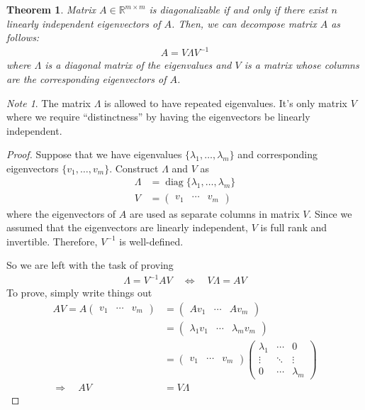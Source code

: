 \documentclass[12pt]{article}
\numberwithin{equation}{section} %
\theoremstyle{plain}
\newtheorem{thm}{Theorem}[section]
\theoremstyle{definition}
\theoremstyle{remark}
\newtheorem*{note}{Note}
\newcommand{\diag}{\operatorname{diag}}
\newcommand{\Rmm}{\mathbb{R}^{m\times m}}
\begin{document}
\begin{thm}
\label{thm:eigendecomp}
Matrix $A\in \Rmm$ is diagonalizable if and only if there exist $n$
linearly independent eigenvectors of $A$. Then, we can decompose matrix
$A$ as follows:
\begin{align*}
  A =
  V \Lambda V^{-1}
\end{align*}
where $\Lambda$ is a diagonal matrix of the eigenvalues and $V$ is a matrix
whose columns are the corresponding eigenvectors of $A$.
\end{thm}
\begin{note}
The matrix $\Lambda$ is allowed to have repeated eigenvalues. It's only matrix
$V$ where we require ``distinctness'' by having the eigenvectors be
linearly independent.
\end{note}

\begin{proof}
Suppose that we have eigenvalues $\{\lambda_1,\ldots,\lambda_m\}$ and
corresponding eigenvectors $\{v_1,\ldots,v_m\}$.
Construct $\Lambda$ and $V$ as
\begin{align*}
  \Lambda &= \diag\{\lambda_1, \ldots, \lambda_m\} \\
  V &=
  \begin{pmatrix}
    v_1 & \cdots & v_m
  \end{pmatrix}
\end{align*}
where the eigenvectors of $A$ are used as separate columns in matrix
$V$.  Since we assumed that the eigenvectors are linearly independent,
$V$ is full rank and invertible. Therefore, $V^{-1}$ is well-defined.

So we are left with the task of proving
\begin{align*}
  \Lambda = V^{-1} A V
  \quad\Leftrightarrow\quad
  V\Lambda = A V
\end{align*}
To prove, simply write things out
\begin{align*}
  AV = A
  \begin{pmatrix}
    v_1 & \cdots & v_m
  \end{pmatrix}
  &=
  \begin{pmatrix}
    Av_1 & \cdots & Av_m
  \end{pmatrix} \\
  &=
  \begin{pmatrix}
    \lambda_1 v_1 & \cdots & \lambda_m v_m
  \end{pmatrix} \\
  &=
  \begin{pmatrix}
    v_1 & \cdots & v_m
  \end{pmatrix}
  \begin{pmatrix}
    \lambda_1 & \cdots & 0 \\
    \vdots & \ddots & \vdots \\
    0 & \cdots & \lambda_m
  \end{pmatrix}\\
  \Rightarrow\quad
  AV &= V\Lambda
\end{align*}
\end{proof}
\end{document}
